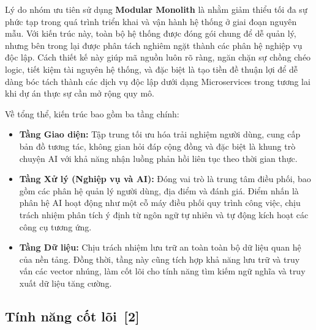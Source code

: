 \documentclass[12pt, a4paper]{article}
\begin{document}
\begin{infobox}
Lý do nhóm ưu tiên sử dụng \textbf{Modular Monolith} là nhằm giảm thiểu tối đa sự phức tạp trong quá trình triển khai và vận hành hệ thống ở giai đoạn nguyên mẫu. Với kiến trúc này, toàn bộ hệ thống được đóng gói chung để dễ quản lý, nhưng bên trong lại được phân tách nghiêm ngặt thành các phân hệ nghiệp vụ độc lập. Cách thiết kế này giúp mã nguồn luôn rõ ràng, ngăn chặn sự chồng chéo logic, tiết kiệm tài nguyên hệ thống, và đặc biệt là tạo tiền đề thuận lợi để dễ dàng bóc tách thành các dịch vụ độc lập dưới dạng Microservices trong tương lai khi dự án thực sự cần mở rộng quy mô.
\end{infobox}

\noindent Về tổng thể, kiến trúc bao gồm ba tầng chính:
\begin{itemize}[label=\textcolor{blue!70!black}{\faCubes}]
  \item \textbf{Tầng Giao diện:} Tập trung tối ưu hóa trải nghiệm người dùng, cung cấp bản đồ tương tác, không gian hỏi đáp cộng đồng và đặc biệt là khung trò chuyện AI với khả năng nhận luồng phản hồi liên tục theo thời gian thực.
  \item \textbf{Tầng Xử lý (Nghiệp vụ và AI):} Đóng vai trò là trung tâm điều phối, bao gồm các phân hệ quản lý người dùng, địa điểm và đánh giá. Điểm nhấn là phân hệ AI hoạt động như một cỗ máy điều phối quy trình công việc, chịu trách nhiệm phân tích ý định từ ngôn ngữ tự nhiên và tự động kích hoạt các công cụ tương ứng.
  \item \textbf{Tầng Dữ liệu:} Chịu trách nhiệm lưu trữ an toàn toàn bộ dữ liệu quan hệ của nền tảng. Đồng thời, tầng này cũng tích hợp khả năng lưu trữ và truy vấn các vector nhúng, làm cốt lõi cho tính năng tìm kiếm ngữ nghĩa và truy xuất dữ liệu tăng cường.
\end{itemize}

\subsection[Tính năng cốt lõi]{Tính năng cốt lõi \,{\normalfont\small\textcolor{cyan!70!black}{[2]}}}
\end{document}
